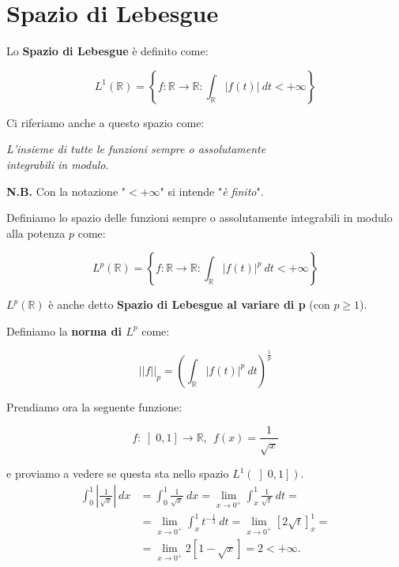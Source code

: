 \section{Spazio di Lebesgue}

\begin{definition}
    Lo \textbf{Spazio di Lebesgue} è definito come:

    $$
        L^1(\mathbb{R}) = \left \{ f: \mathbb{R} \rightarrow \mathbb{R} : \int_\mathbb{R} |f(t)| \ dt < +\infty \right \}
    $$
\end{definition}

Ci riferiamo anche a questo spazio come:
\begin{center}
    \textit{L'insieme di tutte le funzioni sempre
        o assolutamente\\ integrabili in
        modulo}.
\end{center}

\textbf{N.B.} Con la notazione "$< +\infty$" si intende "\textit{è finito}".

\begin{definition}
    Definiamo lo spazio delle funzioni sempre o assolutamente integrabili in
    modulo alla potenza $p$ come:

    $$
        L^p(\mathbb{R}) = \left \{ f: \mathbb{R} \rightarrow \mathbb{R} : \int_\mathbb{R} |f(t)|^p \ dt < +\infty \right \}
    $$

    $L^p (\mathbb{R})$ è anche detto \textbf{Spazio di Lebesgue al variare di p}
    (con $p \ge 1$).
\end{definition}

\begin{definition}
    Definiamo la \textbf{norma di $L^p$} come:

    $$
        ||f||_p = \left( \int_{\mathbb{R}} |f(t)|^p \ dt \right)^{\frac{1}{p}}
    $$
\end{definition}

Prendiamo ora la seguente funzione:

$$
    f : \left] 0, 1 \right] \rightarrow \mathbb{R}, \ \ f(x) = \frac{1}{\sqrt{x}}
$$

e proviamo a vedere se questa sta nello spazio $L^1(\left] 0, 1 \right])$.
\begin{equation}
    \begin{aligned}
        \int_{0}^{1} |\frac{1}{\sqrt{x}}| \ dx & = \int_{0}^{1} \frac{1}{\sqrt{x}} \ dx = \lim_{x \rightarrow 0^+} \int_{x}^{1} \frac{1}{\sqrt{t}} \ dt =          \\
                                               & = \lim_{x \rightarrow 0^+} \int_{x}^{1} t^{-\frac{1}{2}} \ dt = \lim_{x \rightarrow 0^+} [ 2 \sqrt{t} ]_{x}^{1} = \\
                                               & = \lim_{x \rightarrow 0^+} 2 [1 - \sqrt{x}] = 2 < +\infty.
    \end{aligned}
\end{equation}

